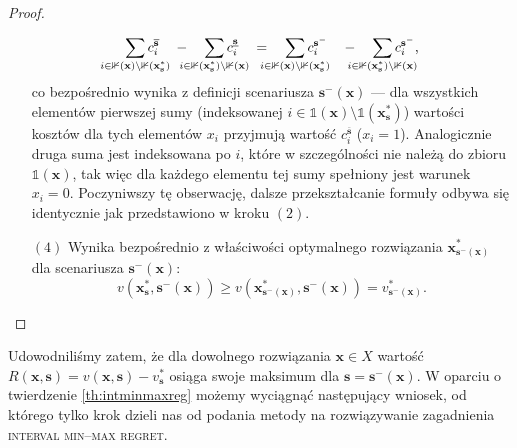 \begin{proof}
\begin{itemize}
		\begin{equation*}
			\sum_{\mathclap{i \in \mathbb{1} \left( \textbf{x} \right) \setminus \mathbb{1} \left( \textbf{x}^{\ast}_{\textbf{s}} \right)}} c^{\overline{\textbf{s}}}_{i} \quad - \quad \sum_{\mathclap{i \in \mathbb{1} \left( \textbf{x}^{\ast}_{\textbf{s}} \right) \setminus \mathbb{1} \left( \textbf{x} \right)}} c^{\underline{\textbf{s}}}_{i} \quad = \quad \sum_{\mathclap{i \in \mathbb{1} \left( \textbf{x} \right) \setminus \mathbb{1} \left( \textbf{x}^{\ast}_{\textbf{s}} \right)}} c^{\textbf{s}^{-}}_{i} \quad - \quad \sum_{\mathclap{i \in \mathbb{1} \left( \textbf{x}^{\ast}_{\textbf{s}} \right) \setminus \mathbb{1} \left( \textbf{x} \right)}} c^{\textbf{s}^{-}}_{i}\text{,}
		\end{equation*}
		co bezpośrednio wynika z definicji scenariusza $\textbf{s}^{-} \left( \textbf{x} \right)$ --- dla wszystkich elementów pierwszej sumy (indeksowanej $i \in \mathbb{1} \left( \textbf{x} \right) \setminus \mathbb{1} \left( \textbf{x}^{\ast}_{\textbf{s}} \right)$) wartości kosztów dla tych elementów $x_{i}$ przyjmują wartość $c^{\overline{\textbf{s}}}_{i}$ ($x_{i} = 1$). Analogicznie druga suma jest indeksowana po $i$, które w szczególności nie należą do zbioru $\mathbb{1} \left( \textbf{x} \right)$, tak więc dla każdego elementu tej sumy spełniony jest warunek $x_{i} = 0$. Poczyniwszy tę obserwację, dalsze przekształcanie formuły odbywa się identycznie jak przedstawiono w kroku $\left( 2 \right)$.
		\item[$\left( 4 \right)$] Wynika bezpośrednio z właściwości optymalnego rozwiązania $\textbf{x}^{\ast}_{\textbf{s}^{-} \left( \textbf{x} \right)}$ dla scenariusza $\textbf{s}^{-} \left( \textbf{x} \right)$:
		\begin{equation*}
			v \left( \textbf{x}^{\ast}_{\textbf{s}}, \textbf{s}^{-} \left( \textbf{x} \right) \right) \geqslant v \left( \textbf{x}^{\ast}_{\textbf{s}^{-} \left( \textbf{x} \right)}, \textbf{s}^{-} \left( \textbf{x} \right) \right) = v^{\ast}_{\textbf{s}^{-} \left( \textbf{x} \right)}\text{.}
		\end{equation*}
	\end{itemize}
\end{proof}

Udowodniliśmy zatem, że dla dowolnego rozwiązania $\textbf{x} \in X$ wartość $ R \left( \textbf{x}, \textbf{s} \right) = v \left( \textbf{x}, \textbf{s} \right) - v^{\ast}_{\textbf{s}}$ osiąga swoje maksimum dla $\textbf{s} = \textbf{s}^{-} \left( \textbf{x} \right)$. W oparciu o twierdzenie \ref{th:intminmaxreg} możemy wyciągnąć następujący wniosek, od którego tylko krok dzieli nas od podania metody na rozwiązywanie zagadnienia \textsc{interval min--max regret}.

